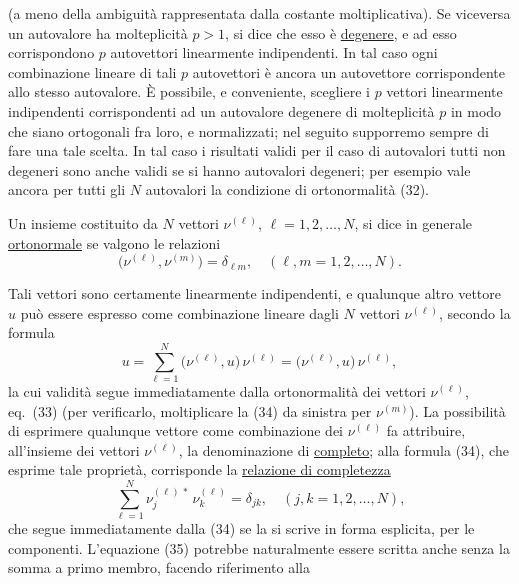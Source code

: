 \documentclass[11pt, a4paper]{book}
\numberwithin{equation}{section}
\begin{document}

(a meno della ambiguità rappresentata dalla costante moltiplicativa). Se
viceversa un autovalore ha molteplicità $p > 1$, si dice che esso è
\uline{degenere}, e ad esso corrispondono $p$ autovettori linearmente
indipendenti. In tal caso ogni combinazione lineare di tali $p$ autovettori
è ancora un autovettore corrispondente allo stesso autovalore. È possibile,
e conveniente, scegliere i $p$ vettori linearmente indipendenti
corrispondenti ad un autovalore degenere di molteplicità $p$ in modo che
siano ortogonali fra loro, e normalizzati; nel seguito supporremo sempre di
fare una tale scelta. In tal caso i risultati validi per il caso di
autovalori tutti non degeneri sono anche validi se si hanno autovalori
degeneri; per esempio vale ancora per tutti gli $N$ autovalori la
condizione di ortonormalità (32).

Un insieme costituito da $N$ vettori $\nu^{(\ell)}$, $\ell=1,2,\ldots,N$,
si dice in generale \uline{ortonormale} se valgono le relazioni
\begin{equation}
\bigl(\nu^{(\ell)}, \nu^{(m)}\bigr) = \delta_{\ell m},
\quad (\ell, m = 1, 2, \ldots, N).
\end{equation}

Tali vettori sono certamente linearmente indipendenti, e qualunque altro
vettore $u$ può essere espresso come combinazione lineare dagli $N$
vettori $\nu^{(\ell)}$, secondo la formula
\begin{equation}
u = \sum_{\ell=1}^{N} \bigl(\nu^{(\ell)}, u\bigr)\,\nu^{(\ell)}
  = \bigl(\nu^{(\ell)}, u\bigr)\,\nu^{(\ell)},
\end{equation}
la cui validità segue immediatamente dalla ortonormalità dei vettori
$\nu^{(\ell)}$, eq.\ (33) (per verificarlo, moltiplicare la (34) da
sinistra per $\nu^{(m)}$). La possibilità di esprimere qualunque vettore
come combinazione dei $\nu^{(\ell)}$ fa attribuire, all'insieme dei vettori
$\nu^{(\ell)}$, la denominazione di \uline{completo}; alla formula
(34), che esprime tale proprietà, corrisponde la \uline{relazione di
completezza}
\begin{equation}
\sum_{\ell=1}^{N} \nu_j^{(\ell)\,*}\,\nu_k^{(\ell)} = \delta_{jk},
\quad (j,k = 1,2,\ldots,N),
\end{equation}
che segue immediatamente dalla (34) se la si scrive in forma esplicita,
per le componenti. L'equazione (35) potrebbe naturalmente essere scritta
anche senza la somma a primo membro, facendo riferimento alla
\end{document}
